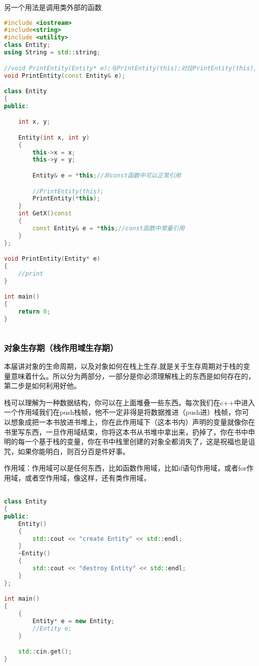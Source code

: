 另一个用法是调用类外部的函数

\begin{lstlisting}[language=c++]
#include <iostream>
#include<string>
#include <utility>
class Entity;
using String = std::string;

//void PrintEntity(Entity* e);与PrintEntity(this);对应PrintEntity(this);
void PrintEntity(const Entity& e);

class Entity
{
public:

    int x, y;

    Entity(int x, int y)
    {
        this->x = x;
        this->y = y;

        Entity& e = *this;//非const函数中可以正常引用

        //PrintEntity(this);
        PrintEntity(*this);
    }
    int GetX()const
    {
        const Entity& e = *this;//const函数中常量引用
    }
};

void PrintEntity(Entity* e)
{
    //print
}

int main()
{
    return 0;
}
  
\end{lstlisting}


\subsubsection{对象生存期（栈作用域生存期）}

本届讲对象的生命周期，以及对象如何在栈上生存,就是关于生存周期对于栈的变量意味着什么。所以分为两部分，一部分是你必须理解栈上的东西是如何存在的，第二步是如何利用好他。

栈可以理解为一种数据结构，你可以在上面堆叠一些东西。每次我们在c++中进入一个作用域我们在push栈帧，他不一定非得是将数据推进（push进）栈帧，你可以想象成把一本书放进书堆上，你在此作用域下（这本书内）声明的变量就像你在书里写东西，一旦作用域结束，你将这本书从书堆中拿出来，扔掉了，你在书中申明的每一个基于栈的变量，你在书中栈里创建的对象全都消失了，这是祝福也是诅咒，如果你能明白，则百分百是件好事。

作用域：作用域可以是任何东西，比如函数作用域，比如{\ncodestyle if}语句作用域，或者{\ncodestyle for}作用域，或者空作用域，像这样{\ncodestyle {}}，还有类作用域，

\begin{lstlisting}[language=c++]

class Entity
{
public:
    Entity()
    {
        std::cout << "create Entity" << std::endl;
    }
    ~Entity()
    {
        std::cout << "destroy Entity" << std::endl;
    }
};

int main()
{
    {
        Entity* e = new Entity;
        //Entity e;
    }

    std::cin.get();
}
\end{lstlisting}

